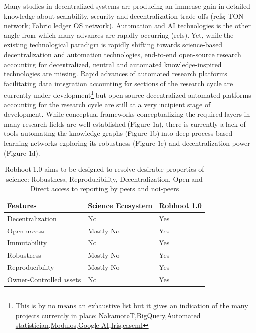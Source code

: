 \documentclass[10pt, a4paper, twocolumn]{article} %
\begin{document}
Many studies in decentralized systems are producing an immense gain in
detailed knowledge about scalability, security and decentralization
trade-offs (refs; TON network; Fabric ledger OS network). Automation
and AI technologies is the other angle from which many advances are
rapidly occurring (refs). Yet, while the existing technological
paradigm is rapidly shifting towards science-based decentralization
and automation technologies, end-to-end open-source research
accounting for decentralized, neutral and automated knowledge-inspired
technologies are missing. Rapid advances of automated research
platforms facilitating data integration accounting for sections of the
research cycle are currently under development\footnote{This is by no
  means an exhaustive list but it gives an indication of the many
  projects currently in place:
  \href{https://www.nterminal.com}{NakamotoT},\href{https://cloud.google.com/bigquery/}{BigQuery},\href{https://www.automaticstatistician.com/index/}{Automated
    statistician},\href{http://www.modulos.ai/}{Modulos},\href{https://ai.google/}{Google
    AI},\href{https://iris.ai}{Iris},\href{https://github.com/DS3Lab/easeml}{easeml}}
but open-source decentralized automated platforms accounting for the
research cycle are still at a very incipient stage of development. While conceptual frameworks conceptualizing the required layers in
many research fields are well established (Figure 1a), there is
currently a lack of tools automating the knowledge graphs (Figure 1b)
into deep process-based learning networks exploring its
robustness (Figure 1c) and decentralization power (Figure 1d).

\begin{table}
\begin{tabular}{ p{3cm} | p{2cm} | p{2cm}}
  \hline \hline
  \textbf{Features} & \textbf{Science Ecosystem} &\textbf{Robhoot 1.0}\\  \hline
  Decentralization & No & Yes \\ \hline
  Open-access & Mostly No & Yes \\ \hline
  Immutability & No & Yes \\ \hline
  Robustness & Mostly No & Yes \\ \hline
  Reproducibility & Mostly No & Yes \\ \hline        
  Owner-Controlled assets & No & Yes \\ \hline       
  \bottomrule

\end{tabular}
\caption{Robhoot 1.0 aims to be designed to resolve desirable
  properties of science: Robustness, Reproducibility,
  Decentralization, Open and Direct access to reporting by peers and
  not-peers}
\end{table}
\end{document}
